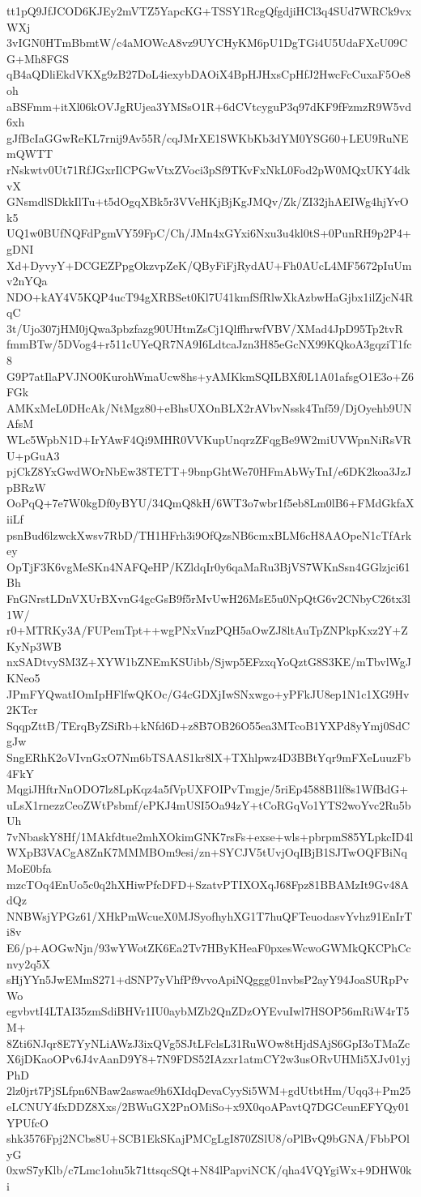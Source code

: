 tt1pQ9JfJCOD6KJEy2mVTZ5YapcKG+TSSY1RcgQfgdjiHCl3q4SUd7WRCk9vxWXj
3vIGN0HTmBbmtW/c4aMOWcA8vz9UYCHyKM6pU1DgTGi4U5UdaFXcU09CG+Mh8FGS
qB4aQDliEkdVKXg9zB27DoL4iexybDAOiX4BpHJHxsCpHfJ2HwcFcCuxaF5Oe8oh
aBSFmm+itXl06kOVJgRUjea3YMSsO1R+6dCVtcyguP3q97dKF9fFzmzR9W5vd6xh
gJfBcIaGGwReKL7rnij9Av55R/cqJMrXE1SWKbKb3dYM0YSG60+LEU9RuNEmQWTT
rNskwtv0Ut71RfJGxrIlCPGwVtxZVoci3pSf9TKvFxNkL0Fod2pW0MQxUKY4dkvX
GNsmdlSDkkIlTu+t5dOgqXBk5r3VVeHKjBjKgJMQv/Zk/ZI32jhAEIWg4hjYvOk5
UQ1w0BUfNQFdPgmVY59FpC/Ch/JMn4xGYxi6Nxu3u4kl0tS+0PunRH9p2P4+gDNI
Xd+DyvyY+DCGEZPpgOkzvpZeK/QByFiFjRydAU+Fh0AUcL4MF5672pIuUmv2nYQa
NDO+kAY4V5KQP4ucT94gXRBSet0Kl7U41kmfSfRlwXkAzbwHaGjbx1ilZjcN4RqC
3t/Ujo307jHM0jQwa3pbzfazg90UHtmZsCj1QlffhrwfVBV/XMad4JpD95Tp2tvR
fmmBTw/5DVog4+r511cUYeQR7NA9I6LdtcaJzn3H85eGcNX99KQkoA3gqziT1fc8
G9P7atIlaPVJNO0KurohWmaUcw8hs+yAMKkmSQILBXf0L1A01afsgO1E3o+Z6FGk
AMKxMeL0DHcAk/NtMgz80+eBhsUXOnBLX2rAVbvNssk4Tnf59/DjOyehb9UNAfsM
WLc5WpbN1D+IrYAwF4Qi9MHR0VVKupUnqrzZFqgBe9W2miUVWpnNiRsVRU+pGuA3
pjCkZ8YxGwdWOrNbEw38TETT+9bnpGhtWe70HFmAbWyTnI/e6DK2koa3JzJpBRzW
OoPqQ+7e7W0kgDf0yBYU/34QmQ8kH/6WT3o7wbr1f5eb8Lm0lB6+FMdGkfaXiiLf
psnBud6lzwckXwsv7RbD/TH1HFrh3i9OfQzsNB6cmxBLM6cH8AAOpeN1cTfArkey
OpTjF3K6vgMeSKn4NAFQeHP/KZldqIr0y6qaMaRu3BjVS7WKnSsn4GGlzjci61Bh
FnGNrstLDnVXUrBXvnG4gcGsB9f5rMvUwH26MsE5u0NpQtG6v2CNbyC26tx3l1W/
r0+MTRKy3A/FUPemTpt++wgPNxVnzPQH5aOwZJ8ltAuTpZNPkpKxz2Y+ZKyNp3WB
nxSADtvySM3Z+XYW1bZNEmKSUibb/Sjwp5EFzxqYoQztG8S3KE/mTbvlWgJKNeo5
JPmFYQwatIOmIpHFlfwQKOc/G4cGDXjIwSNxwgo+yPFkJU8ep1N1c1XG9Hv2KTcr
SqqpZttB/TErqByZSiRb+kNfd6D+z8B7OB26O55ea3MTcoB1YXPd8yYmj0SdCgJw
SngERhK2oVIvnGxO7Nm6bTSAAS1kr8lX+TXhlpwz4D3BBtYqr9mFXeLuuzFb4FkY
MqgiJHftrNnODO7lz8LpKqz4a5fVpUXFOIPvTmgje/5riEp4588B1lf8s1WfBdG+
uLsX1rnezzCeoZWtPsbmf/ePKJ4mUSI5Oa94zY+tCoRGqVo1YTS2woYvc2Ru5bUh
7vNbaskY8Hf/1MAkfdtue2mhXOkimGNK7rsFs+exse+wls+pbrpmS85YLpkcID4l
WXpB3VACgA8ZnK7MMMBOm9esi/zn+SYCJV5tUvjOqIBjB1SJTwOQFBiNqMoE0bfa
mzcTOq4EnUo5c0q2hXHiwPfcDFD+SzatvPTIXOXqJ68Fpz81BBAMzIt9Gv48AdQz
NNBWsjYPGz61/XHkPmWcueX0MJSyofhyhXG1T7huQFTeuodasvYvhz91EnIrTi8v
E6/p+AOGwNjn/93wYWotZK6Ea2Tv7HByKHeaF0pxesWcwoGWMkQKCPhCcnvy2q5X
sHjYYn5JwEMmS271+dSNP7yVhfPf9vvoApiNQggg01nvbsP2ayY94JoaSURpPvWo
egvbvtI4LTAI35zmSdiBHVr1IU0aybMZb2QnZDzOYEvuIwl7HSOP56mRiW4rT5M+
8Zti6NJqr8E7YyNLiAWzJ3ixQVg5SJtLFclsL31RuWOw8tHjdSAjS6GpI3oTMaZc
X6jDKaoOPv6J4vAanD9Y8+7N9FDS52IAzxr1atmCY2w3usORvUHMi5XJv01yjPhD
2lz0jrt7PjSLfpn6NBaw2aswae9h6XIdqDevaCyySi5WM+gdUtbtHm/Uqq3+Pm25
eLCNUY4fxDDZ8Xxs/2BWuGX2PnOMiSo+x9X0qoAPavtQ7DGCeunEFYQy01YPUfcO
shk3576Fpj2NCbs8U+SCB1EkSKajPMCgLgI870ZSlU8/oPlBvQ9bGNA/FbbPOlyG
0xwS7yKlb/c7Lmc1ohu5k71ttsqcSQt+N84lPapviNCK/qha4VQYgiWx+9DHW0ki
